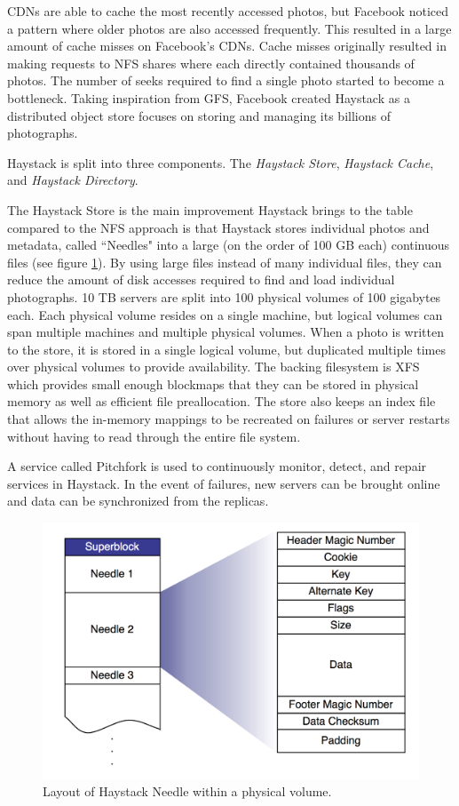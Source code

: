 \documentclass[]{article}
\begin{document}
CDNs are able to cache the most recently accessed photos, but Facebook noticed a pattern where older photos are also accessed frequently. This resulted in a large amount of cache misses on Facebook's CDNs. Cache misses originally resulted in making requests to NFS shares where each directly contained thousands of photos. The number of seeks required to find a single photo started to become a bottleneck. Taking inspiration from GFS, Facebook created Haystack as a distributed object store focuses on storing and managing its billions of photographs.

Haystack is split into three components. The \textit{Haystack Store}, \textit{Haystack Cache}, and \textit{Haystack Directory}.

The Haystack Store is the main improvement Haystack brings to the table compared to the NFS approach is that Haystack stores individual photos and metadata, called ``Needles" into a large (on the order of 100 GB each) continuous files (see figure \ref{fig:haystack}). By using large files instead of many individual files, they can reduce the amount of disk accesses required to find and load individual photographs. 10 TB servers are split into 100 physical volumes of 100 gigabytes each. Each physical volume resides on a single machine, but logical volumes can span multiple machines and multiple physical volumes. When a photo is written to the store, it is stored in a single logical volume, but duplicated multiple times over physical volumes to provide availability. The backing filesystem is XFS which provides small enough blockmaps that they can be stored in physical memory as well as efficient file preallocation. The store also keeps an index file that allows the in-memory mappings to be recreated on failures or server restarts without having to read through the entire file system.

A service called Pitchfork is used to continuously monitor, detect, and repair services in Haystack. In the event of failures, new servers can be brought online and data can be synchronized from the replicas.

\begin{figure}
	\centering
	\includegraphics[width=1.0\linewidth]{img/haystack}
	\caption[Haystack individual file layout.]{Layout of Haystack Needle within a physical volume.\cite{beaver_finding_2010}}
	\label{fig:haystack}
\end{figure}
\end{document}
